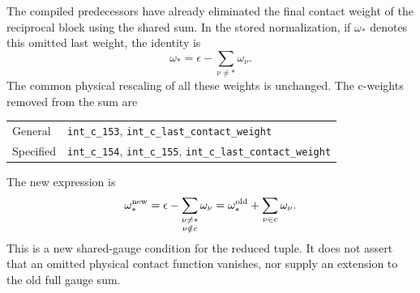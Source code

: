 \documentclass[11pt]{article}
\begin{document}
The compiled predecessors have already eliminated the final
contact weight of the reciprocal block using the shared sum.
In the stored normalization, if $\omega_*$ denotes this omitted
last weight, the identity is
\begin{equation}\label{oldsum}
                   \omega_*=\epsilon-\sum_{\nu\ne *}\omega_\nu.
\end{equation}
The common physical rescaling of all these weights is unchanged.
The c-weights removed from the sum are
\begin{center}
\begin{tabular}{@{}ll@{}}
\toprule
General & \texttt{int\_c\_153}, \texttt{int\_c\_last\_contact\_weight}\\
Specified & \texttt{int\_c\_154}, \texttt{int\_c\_155},
 \texttt{int\_c\_last\_contact\_weight}\\
\bottomrule
\end{tabular}
\end{center}
The new expression is
\begin{equation}\label{newsum}
 \omega_*^{\rm new}
   =\epsilon-\sum_{\substack{\nu\ne *\\\nu\notin c}}\omega_\nu
   =\omega_*^{\rm old}+\sum_{\nu\in c}\omega_\nu.
\end{equation}
This is a new shared-gauge condition for the reduced tuple.
It does not assert that an omitted physical contact function
vanishes, nor supply an extension to the old full gauge sum.
\end{document}
